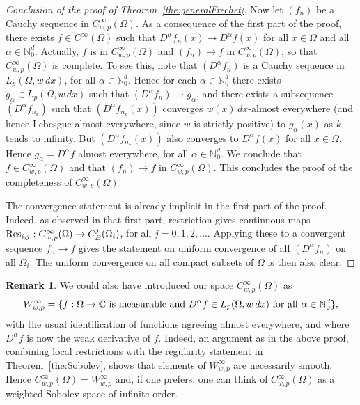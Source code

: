 \documentclass[12pt, reqno]{amsart}
\numberwithin{equation}{section}
\theoremstyle{plain}
\theoremstyle{definition}
\newtheorem{remark}[theorem]{Remark}
\begin{document}
\begin{proof}[Conclusion of the proof of Theorem~\ref{the:generalFrechet}]
Now let ${({f_n})}$ be a Cauchy sequence in ${{C_{w,p}^\infty(\Omega)}}$. As a consequence of the first part of the proof, there exists $f\in C^{\infty}(\Omega)$ such that $D^\alpha f_n (x)\to D^\alpha f(x)$ for all $x\in \Omega$ and all $\alpha\in{{\mathbb N}}_0^d$. Actually, $f$ is in ${{C_{w,p}^\infty(\Omega)}}$ and ${({f_n})}\to f$ in ${{C_{w,p}^\infty(\Omega)}}$, so that ${{C_{w,p}^\infty(\Omega)}}$ is complete. To see this, note that ${({D^\alpha f_n})}$ is a Cauchy sequence in $L_{p}(\Omega,w\,dx)$, for all $\alpha\in{{\mathbb N}}_0^d$. Hence for each $\alpha\in{{\mathbb N}}_0^d$ there exists $g_\alpha\in L_p(\Omega, w\,dx)$ such that ${({D^\alpha f_n})}\to g_\alpha$, and there exists a subsequence ${({D^\alpha f_{n_k}})}$ such that ${({D^\alpha f_{n_k}(x)})}$ converges $w(x)\,dx$-almost everywhere (and hence Lebesgue almost everywhere, since $w$ is strictly positive) to $g_\alpha (x)$ as $k$ tends to infinity. But ${({D^\alpha f_{n_k}(x)})}$ also converges to $D^\alpha f(x)$ for all $x\in \Omega$. Hence $g_\alpha=D^\alpha f$ almost everywhere, for all $\alpha\in{{\mathbb N}}_0^d$. We conclude that $f\in{{C_{w,p}^\infty(\Omega)}}$ and that ${({f_n})}\to f$ in ${{C_{w,p}^\infty(\Omega)}}$. This concludes the proof of the completeness of ${{C_{w,p}^\infty(\Omega)}}$.

The convergence statement is already implicit in the first part of the proof. Indeed, as observed in that first part, restriction gives continuous maps  $\textup{Res}_{i,j}:{{C_{w,p}^\infty(\Omega)}}\to C_B^{j}(\Omega_i)$, for all $j=0,1,2,\ldots$. Applying these to a convergent sequence $f_n\to f$ gives the statement on uniform convergence of all ${({D^\alpha f_n})}$ on all $\Omega_i$. The uniform convergence on all compact subsets of $\Omega$ is then also clear.
\end{proof}

\begin{remark}
We could also have introduced our space ${{C_{w,p}^\infty(\Omega)}}$ as
\begin{equation*}
W_{w,p}^\infty =\{f:\Omega\to\mathbb C \textup{ is measurable and } D^\alpha f\in L_{p}(\Omega, w\,dx) \textup{ for all } \alpha\in{{\mathbb N}}_0^d\},
\end{equation*}
with the usual identification of functions agreeing almost everywhere, and where $D^\alpha f$ is now the weak derivative of $f$. Indeed, an argument as in the above proof, combining local restrictions with the regularity statement in Theorem~\ref{the:Sobolev}, shows that elements of $W_{w,p}^\infty$ are necessarily smooth. Hence ${{C_{w,p}^\infty(\Omega)}}=W_{w,p}^\infty$ and, if one prefers, one can think of ${{C_{w,p}^\infty(\Omega)}}$ as a weighted Sobolev space of infinite order.
\end{remark}
\end{document}
